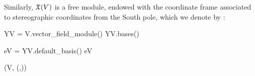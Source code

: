 Similarly, $\mathfrak{X}(V)$ is a free module, endowed with the coordinate frame
associated to stereographic coordinates from the South pole, which we
denote by :
\begin{NBin}
YV = V.vector_field_module()
YV.bases()
\end{NBin}
\begin{NBoutM}
\end{NBoutM}
\vspace*{-\baselineskip}
\begin{NBin}
eV = YV.default_basis()
eV
\end{NBin}
\begin{NBoutM}
\left(V, \left(,\right)\right)
\end{NBoutM}

